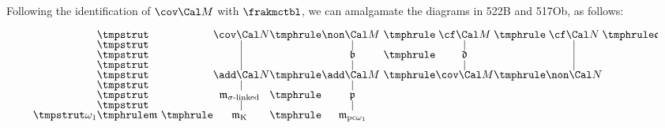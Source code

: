  Following the identification of
$\cov\Cal M$ with $\frakmctbl$, we can amalgamate the diagrams in 522B
and 517Ob, as follows:

$$\vbox{\offinterlineskip
\halign{\hfil#\hfil&\hfil#\hfil&\hfil#\hfil&\hfil#\hfil
  &\hfil#\hfil&\hfil#\hfil&\hfil#\hfil&\hfil#\hfil&\hfil#\hfil
  &\hfil#\hfil&\hfil#\hfil&\hfil#\hfil&\hfil#\hfil\cr
&\tmpstrut&&&$\cov\Cal N$&\tmphrule&$\non\Cal M$
  &\tmphrule&$\cf\Cal M$&\tmphrule&$\cf\Cal N$&\tmphrule&$\frak c$\cr
&\tmpstrut&&&\vrule&&\vrule&&\vrule&&\vrule\cr
&\tmpstrut&&&\vrule&&$\frak b$&\tmphrule&$\frak d$&&\vrule\cr
&\tmpstrut&&&\vrule&&\vrule&&\vrule&&\vrule\cr
&\tmpstrut&&&$\add\Cal N$&\tmphrule&$\add\Cal M$
  &\tmphrule&$\cov\Cal M$&\tmphrule&$\non\Cal N$\cr
&\tmpstrut&&&\vrule&&\vrule\cr
&\tmpstrut&&&$\frak m_{\sigma\text{-linked}}$
  &\tmphrule&$\frak p$\cr
&\tmpstrut&&&\vrule&&\vrule\cr
$\tmpstrut\omega_1$&\tmphrule&$\frak m$
  &\tmphrule&$\frak m_{\text{K}}$
  &\tmphrule&$\frak m_{\text{pc}\omega_1}$\cr
}}$$

